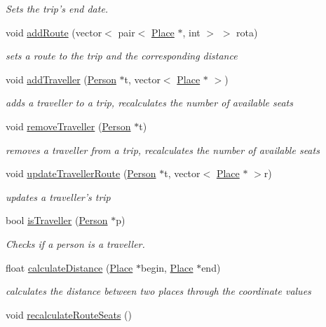 \begin{DoxyCompactItemize}
\begin{DoxyCompactList}\small\item\em Sets the trip's end date. \end{DoxyCompactList}\item 
void \hyperlink{class_trip_adae7ef5a06244525d607f96bee531c49}{add\+Route} (vector$<$ pair$<$ \hyperlink{class_place}{Place} $\ast$, int $>$ $>$ rota)
\begin{DoxyCompactList}\small\item\em sets a route to the trip and the corresponding distance \end{DoxyCompactList}\item 
void \hyperlink{class_trip_a670b6fd9f234cb0448bc72454f0e546d}{add\+Traveller} (\hyperlink{class_person}{Person} $\ast$t, vector$<$ \hyperlink{class_place}{Place} $\ast$ $>$)
\begin{DoxyCompactList}\small\item\em adds a traveller to a trip, recalculates the number of available seats \end{DoxyCompactList}\item 
void \hyperlink{class_trip_ad3f71fd3cc8c5adeb9fc19779725081e}{remove\+Traveller} (\hyperlink{class_person}{Person} $\ast$t)
\begin{DoxyCompactList}\small\item\em removes a traveller from a trip, recalculates the number of available seats \end{DoxyCompactList}\item 
void \hyperlink{class_trip_a2d345864b78ff8ad01af06a981f1443b}{update\+Traveller\+Route} (\hyperlink{class_person}{Person} $\ast$t, vector$<$ \hyperlink{class_place}{Place} $\ast$ $>$r)
\begin{DoxyCompactList}\small\item\em updates a traveller's trip \end{DoxyCompactList}\item 
bool \hyperlink{class_trip_a96a633cf3d950759c6734041efc8fe8e}{is\+Traveller} (\hyperlink{class_person}{Person} $\ast$p)
\begin{DoxyCompactList}\small\item\em Checks if a person is a traveller. \end{DoxyCompactList}\item 
float \hyperlink{class_trip_ab93540a771191027779e587968c7da8a}{calculate\+Distance} (\hyperlink{class_place}{Place} $\ast$begin, \hyperlink{class_place}{Place} $\ast$end)
\begin{DoxyCompactList}\small\item\em calculates the distance between two places through the coordinate values \end{DoxyCompactList}\item 
\hypertarget{class_trip_a1f1f9373099f83a3b8b30eb706f757b7}{void \hyperlink{class_trip_a1f1f9373099f83a3b8b30eb706f757b7}{recalculate\+Route\+Seats} ()}\label{class_trip_a1f1f9373099f83a3b8b30eb706f757b7}


\end{DoxyCompactItemize}
